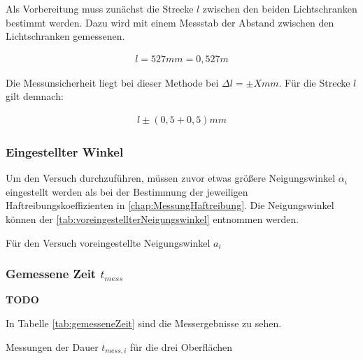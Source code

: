 Als Vorbereitung muss zunächst die Strecke $l$ zwischen den beiden Lichtschranken bestimmt werden.
Dazu wird mit einem Messstab der Abstand zwischen den Lichtschranken gemessenen.

\begin{align*}
    l = 527 mm = 0,527 m
\end{align*}

Die Messunsicherheit liegt bei dieser Methode bei $\Delta l = \pm X mm$. Für die Strecke $l$ gilt demnach:

\begin{align*}
    l \pm (0,5 + 0,5)mm
\end{align*}

\subsubsection{Eingestellter Winkel}

Um den Versuch durchzuführen, müssen zuvor etwas größere Neigungswinkel $\alpha_i$ eingestellt werden als bei der Bestimmung der jeweiligen Haftreibungskoeffizienten in \autoref{chap:MessungHaftreibung}. Die Neigungswinkel können der \autoref{tab:voreingestellterNeigungswinkel} entnommen werden.

\begin{table}[h]
    \center
    \caption[]{Für den Versuch voreingestellte Neigungswinkel $a_i$}
    
    \label{tab:voreingestellterNeigungswinkel}
\end{table}

\subsubsection{Gemessene Zeit $t_{mess}$}

\textbf{TODO}

In Tabelle \autoref{tab:gemesseneZeit} sind die Messergebnisse zu sehen.

\begin{table}[h]
    \center 
    \caption[short]{Messungen der Dauer $t_{mess, i}$ für die drei Oberflächen}
    
    \label{tab:gemesseneZeit} 
\end{table}